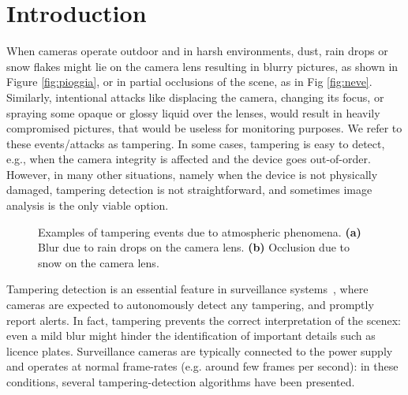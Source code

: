\documentclass{llncs}
\begin{document}
\section{Introduction}\label{sec:introduction}
When cameras operate outdoor and in harsh environments, dust, rain drops or snow flakes might lie on the camera lens resulting in blurry pictures, as shown in Figure \ref{fig:pioggia}, or in partial occlusions of the scene, as in Fig \ref{fig:neve}. Similarly, intentional attacks like displacing the camera, changing its focus, or spraying some opaque or glossy liquid over the lenses, would result in heavily compromised pictures, that would be useless for monitoring purposes. We refer to these events/attacks as tampering. In some cases, tampering is easy to detect, e.g., when the camera integrity is affected and the device goes out-of-order. However, in many other situations, namely when the device is not physically damaged, tampering detection is not straightforward, and sometimes image analysis is the only viable option. 

\begin{figure}[t!]
\centering
{}
\caption[Tampering examples]{Examples of tampering events due to atmospheric phenomena. \textbf{(a)} Blur due to rain drops on the camera lens. \textbf{(b)} Occlusion due to snow on the camera lens.}
\label{fig:tampering}
\end{figure}

Tampering detection is an essential feature in surveillance systems~\cite{hampapur2005smart}, where cameras are expected to autonomously detect any tampering, and promptly report alerts. In fact, tampering prevents the correct interpretation of the scenex: even a mild blur might hinder the identification of important details such as licence plates. Surveillance cameras are typically connected to the power supply and operates at normal frame-rates (e.g. around few frames per second): in these conditions, several tampering-detection algorithms have been presented. 
\end{document}
